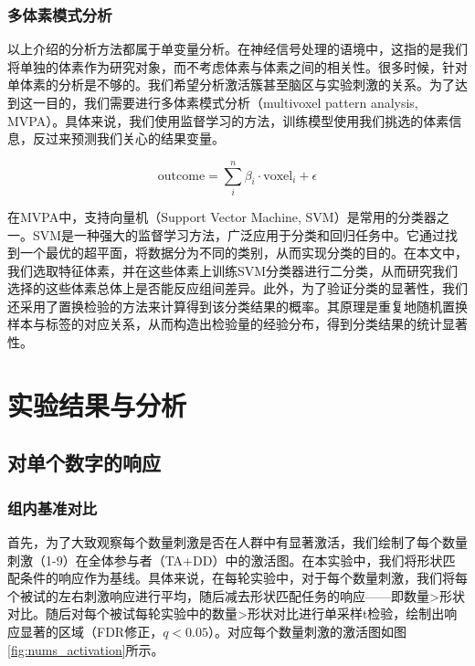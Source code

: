 \documentclass[bachelor, comfort]{shtthesis}
\begin{document}
\subsection{多体素模式分析}
以上介绍的分析方法都属于单变量分析。在神经信号处理的语境中，这指的是我们将单独的体素作为研究对象，而不考虑体素与体素之间的相关性。很多时候，针对单体素的分析是不够的。我们希望分析激活簇甚至脑区与实验刺激的关系。为了达到这一目的，我们需要进行多体素模式分析（multivoxel pattern analysis, MVPA）。具体来说，我们使用监督学习的方法，训练模型使用我们挑选的体素信息，反过来预测我们关心的结果变量。

\[\text{outcome}=\sum_{i}^{n}\beta_{i}\cdot \text{voxel}_{i}+\epsilon\]

在MVPA中，支持向量机（Support Vector Machine, SVM）是常用的分类器之一。SVM是一种强大的监督学习方法，广泛应用于分类和回归任务中。它通过找到一个最优的超平面，将数据分为不同的类别，从而实现分类的目的。在本文中，我们选取特征体素，并在这些体素上训练SVM分类器进行二分类，从而研究我们选择的这些体素总体上是否能反应组间差异。此外，为了验证分类的显著性，我们还采用了置换检验的方法来计算得到该分类结果的概率。其原理是重复地随机置换样本与标签的对应关系，从而构造出检验量的经验分布，得到分类结果的统计显著性。



\chapter{实验结果与分析} %
\section{对单个数字的响应}
\subsection{组内基准对比}
首先，为了大致观察每个数量刺激是否在人群中有显著激活，我们绘制了每个数量刺激（1-9）在全体参与者（TA+DD）中的激活图。在本实验中，我们将形状匹配条件的响应作为基线。具体来说，在每轮实验中，对于每个数量刺激，我们将每个被试的左右刺激响应进行平均，随后减去形状匹配任务的响应——即数量>形状对比。随后对每个被试每轮实验中的数量>形状对比进行单采样t检验，绘制出响应显著的区域（FDR修正，$q<0.05$）。对应每个数量刺激的激活图如图\ref{fig:nums_activation}所示。
\end{document}
